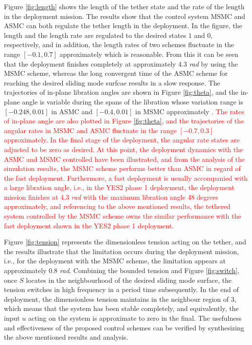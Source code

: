\documentclass[3p]{elsarticle}
\theoremstyle{plain}
\begin{document}
Figure \ref{fig:length} shows the length of the tether state and the rate of the length in the deployment mission. The results show that the control system MSMC and ASMC can both regulate the tether length in the deployment. In the figure, the length and the length rate are regulated to the desired states $1$ and $0$, respectively, and in addition, the length rates of two schemes fluctuate in the range $[-0.1,0.7]$ approximately which is reasonable. From this it can be seen that the deployment finishes completely at approximately 4.3 \textit{rad} by using the MSMC scheme, whereas the long convergent time of the ASMC scheme for reaching the desired sliding mode surfcae results in a slow response. The trajectories of in-plane libration angles are shown in Figure \ref{fig:theta}, and the in-plane angle is variable during the spans of the libration whose variation range is $[-0.248,0.01]$ in ASMC and $[-0.4,0.01]$ in MSMC approximately . \textcolor{red}{ The rates of in-plane angle are also plotted in Figure \ref{fig:theta}, and the trajectories of the angular rates in MSMC and ASMC fluctuate in the range $[-0.7,0.3]$ approximately. In the final stage of the deployment, the angular rate states are adjusted to be zero as desired. At this point, the deployment dynamics with the ASMC and MSMC controlled have been illustrated, and from the analysis of the simulation results, the MSMC scheme performs better than ASMC in regard of the fast deployment. Furthermore, a fast deployment is usually accompanied with a large libration angle, i.e., in the YES2 phase 1 deployment, the deployment mission finishes at 4.3 \textit{rad} with the maximum libration angle 48 degrees approximately\cite{williams2008deployment}, and referencing to the above mentioned results, the tethered system controlled by the MSMC scheme owns the similar performance with the fast deployment shown in the YES2 phase 1 deployment.}\par
Figure \ref{fig:tension} represents the dimensionless tension acting on the tether, and the results illustrate that the limitation occurs during the deployment mission, i.e., for the deployment with the MSMC scheme, the limitation appears at approximately 0.8 \textit{rad}. Combining the bounded tension and Figure \ref{fig:switch}, once $S$ locates in the neighbourhood of the desired sliding mode surface, the tension switches in high frequency in a period time subsequently. In the end of deployment, the dimensionless tension maintains in the neighbour region of $3$, which means that the system has been stable completely, and equivalently, the input $u$ acting on the system is approximate to zero in the final. The usefulness and effectiveness of the proposed control schemes can be verified by synthesizing the above mentioned results and analysis.\par
\end{document}
